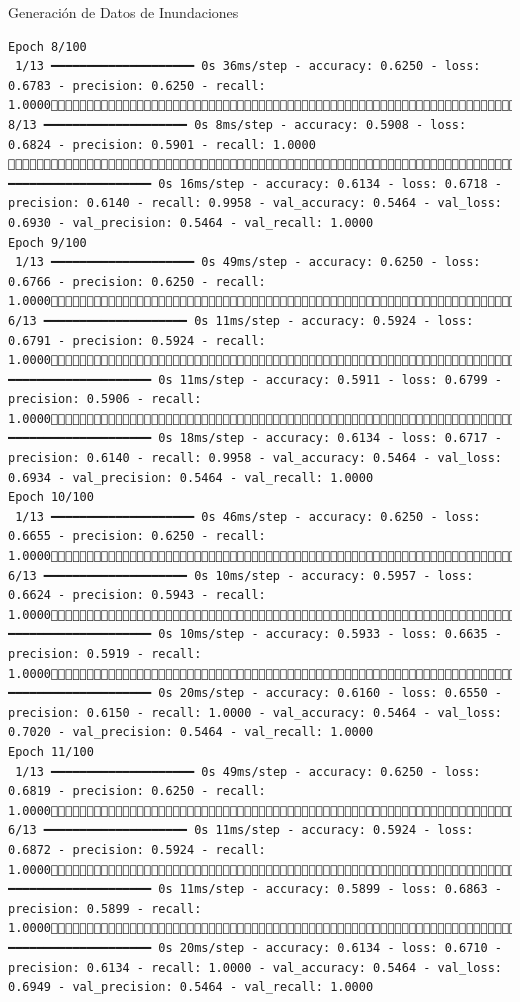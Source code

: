 \documentclass[
  ignorenonframetext,
]{beamer}
\begin{document}
\begin{frame}[fragile]{Generación de Datos de Inundaciones}
\begin{verbatim}
Epoch 8/100
 1/13 ━━━━━━━━━━━━━━━━━━━━ 0s 36ms/step - accuracy: 0.6250 - loss: 0.6783 - precision: 0.6250 - recall: 1.0000 8/13 ━━━━━━━━━━━━━━━━━━━━ 0s 8ms/step - accuracy: 0.5908 - loss: 0.6824 - precision: 0.5901 - recall: 1.0000 13/13 ━━━━━━━━━━━━━━━━━━━━ 0s 16ms/step - accuracy: 0.6134 - loss: 0.6718 - precision: 0.6140 - recall: 0.9958 - val_accuracy: 0.5464 - val_loss: 0.6930 - val_precision: 0.5464 - val_recall: 1.0000
Epoch 9/100
 1/13 ━━━━━━━━━━━━━━━━━━━━ 0s 49ms/step - accuracy: 0.6250 - loss: 0.6766 - precision: 0.6250 - recall: 1.0000 6/13 ━━━━━━━━━━━━━━━━━━━━ 0s 11ms/step - accuracy: 0.5924 - loss: 0.6791 - precision: 0.5924 - recall: 1.000011/13 ━━━━━━━━━━━━━━━━━━━━ 0s 11ms/step - accuracy: 0.5911 - loss: 0.6799 - precision: 0.5906 - recall: 1.000013/13 ━━━━━━━━━━━━━━━━━━━━ 0s 18ms/step - accuracy: 0.6134 - loss: 0.6717 - precision: 0.6140 - recall: 0.9958 - val_accuracy: 0.5464 - val_loss: 0.6934 - val_precision: 0.5464 - val_recall: 1.0000
Epoch 10/100
 1/13 ━━━━━━━━━━━━━━━━━━━━ 0s 46ms/step - accuracy: 0.6250 - loss: 0.6655 - precision: 0.6250 - recall: 1.0000 6/13 ━━━━━━━━━━━━━━━━━━━━ 0s 10ms/step - accuracy: 0.5957 - loss: 0.6624 - precision: 0.5943 - recall: 1.000011/13 ━━━━━━━━━━━━━━━━━━━━ 0s 10ms/step - accuracy: 0.5933 - loss: 0.6635 - precision: 0.5919 - recall: 1.000013/13 ━━━━━━━━━━━━━━━━━━━━ 0s 20ms/step - accuracy: 0.6160 - loss: 0.6550 - precision: 0.6150 - recall: 1.0000 - val_accuracy: 0.5464 - val_loss: 0.7020 - val_precision: 0.5464 - val_recall: 1.0000
Epoch 11/100
 1/13 ━━━━━━━━━━━━━━━━━━━━ 0s 49ms/step - accuracy: 0.6250 - loss: 0.6819 - precision: 0.6250 - recall: 1.0000 6/13 ━━━━━━━━━━━━━━━━━━━━ 0s 11ms/step - accuracy: 0.5924 - loss: 0.6872 - precision: 0.5924 - recall: 1.000011/13 ━━━━━━━━━━━━━━━━━━━━ 0s 11ms/step - accuracy: 0.5899 - loss: 0.6863 - precision: 0.5899 - recall: 1.000013/13 ━━━━━━━━━━━━━━━━━━━━ 0s 20ms/step - accuracy: 0.6134 - loss: 0.6710 - precision: 0.6134 - recall: 1.0000 - val_accuracy: 0.5464 - val_loss: 0.6949 - val_precision: 0.5464 - val_recall: 1.0000

\end{verbatim}
\end{frame}
\end{document}

